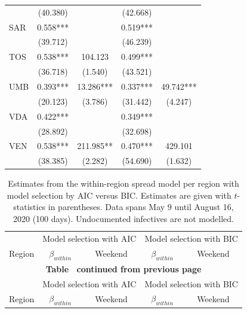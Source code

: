 \documentclass[12pt]{article}
\begin{document}
\begin{appendices}
\begin{longtable}{@{}lcccc@{}}
             & (40.380) &  & (42.668) &  \\ 
            SAR & 0.558*** &  & 0.519*** &  \\ 
             & (39.712) &  & (46.239) &  \\ 
            TOS & 0.538*** & 104.123 & 0.499*** &  \\ 
             & (36.718) & (1.540) & (43.521) &  \\ 
            UMB & 0.393*** & 13.286*** & 0.337*** & 49.742*** \\ 
             & (20.123) & (3.786) & (31.442) & (4.247) \\ 
            VDA & 0.422*** &  & 0.349*** &  \\ 
             & (28.892) &  & (32.698) &  \\ 
            VEN & 0.538*** & 211.985** & 0.470*** & 429.101 \\ 
             & (38.385) & (2.282) & (54.690) & (1.632) \\* \bottomrule
    	\end{longtable}
		
		\begin{longtable}{@{}lcccc@{}}
    		\caption{Estimates from the within-region spread model per region with model selection by AIC versus BIC. Estimates are given with $t$-statistics in parentheses. Data spans May 9 until August 16, 2020 (100 days). Undocumented infectives are not modelled.}
    		\label{tab:model_within_aic_vs_bic}\\
    		\toprule
    		                & \multicolumn{2}{c}{Model selection with AIC} & \multicolumn{2}{c}{Model selection with BIC} \\
    		                \cmidrule(lr){2-3}
                            \cmidrule(lr){4-5}
    		Region          & $\beta_{within}$ & Weekend & $\beta_{within}$ & Weekend \\* \midrule
    		\endfirsthead
    		
    		\multicolumn{5}{c}{{\bfseries Table \thetable\ continued from previous page}} \\
    		\toprule
    		                & \multicolumn{2}{c}{Model selection with AIC} & \multicolumn{2}{c}{Model selection with BIC} \\
    		                \cmidrule(lr){2-3}
                            \cmidrule(lr){4-5}
    		Region          & $\beta_{within}$ & Weekend & $\beta_{within}$ & Weekend \\* \midrule
    		\endhead
    		

\end{longtable}
\end{appendices}
\end{document}
